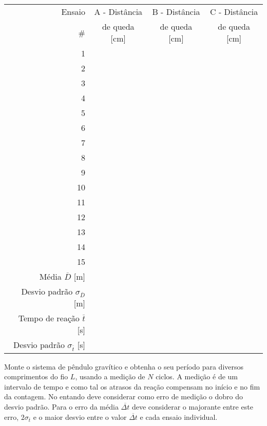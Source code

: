 \documentclass[a4paper,12pt]{article}      %
\begin{document}


\begin{center}
\begin{footnotesize}
\begin{tabular}{|r|c|c|c|}
\hline
Ensaio  & A - Distância & B - Distância & C - Distância  \\
\# & de queda [cm] & de queda [cm] & de queda [cm]\\
\hline \hline
1 & & & \\
\hline
2 & &  &\\
\hline 3 & & & \\
\hline 4 & & & \\
\hline 5 & & & \\
\hline 6 & & & \\
\hline 7 & & & \\
\hline 8 & & & \\
\hline 9 & & & \\
\hline 10 & & & \\
\hline 11 & & & \\
\hline 12 & & & \\
\hline 13 & & & \\
\hline 14 & & & \\
\hline 15 & & & \\
\hline \hline
Média $\overline{D}$ [m] & &  & \\ \hline
Desvio padrão  $\sigma_{\overline{D}}$ [m] & & & \\ \hline
Tempo de reação $\overline{t}$ [s] & & & \\ \hline %
Desvio padrão  $\sigma_{\overline{t}}$ [s] & & & \\
\hline

\end{tabular}
\end{footnotesize}
\end{center}


Monte o sistema de pêndulo gravítico e obtenha o seu período para diversos comprimentos do fio $L$, usando a medição de $N$ ciclos. 
A medição é de um intervalo de tempo e como tal os atrasos da reação compensam no início e no fim da contagem. No entando deve considerar como  
erro de medição o dobro do desvio padrão. Para o erro da média $\overline{\Delta t}$ deve considerar o majorante entre este erro, $2 \sigma_{\overline{t}}$ e o maior desvio entre o valor  $\overline{\Delta  t} $ e cada ensaio individual. 
\end{document}
